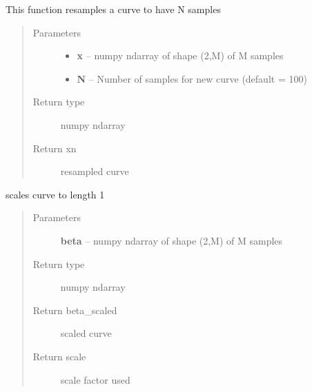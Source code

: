 \documentclass[letterpaper,10pt,english]{sphinxmanual}
\begin{document}

\begin{fulllineitems}
\label{curve_functions:curve_functions.resamplecurve}
This function resamples a curve to have N samples
\begin{quote}\begin{description}
\item[{Parameters}] \leavevmode\begin{itemize}
\item {} 
\textbf{x} -- numpy ndarray of shape (2,M) of M samples

\item {} 
\textbf{N} -- Number of samples for new curve (default = 100)

\end{itemize}

\item[{Return type}] \leavevmode
numpy ndarray

\item[{Return xn}] \leavevmode
resampled curve

\end{description}\end{quote}

\end{fulllineitems}


\begin{fulllineitems}
\label{curve_functions:curve_functions.scale_curve}
scales curve to length 1
\begin{quote}\begin{description}
\item[{Parameters}] \leavevmode
\textbf{beta} -- numpy ndarray of shape (2,M) of M samples

\item[{Return type}] \leavevmode
numpy ndarray

\item[{Return beta\_scaled}] \leavevmode
scaled curve

\item[{Return scale}] \leavevmode
scale factor used

\end{description}\end{quote}

\end{fulllineitems}
\end{document}
